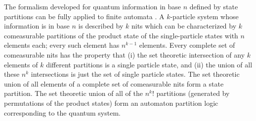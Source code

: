 \documentclass{llncs}
\begin{document}
The formalism developed for quantum information in base $n$ defined by state partitions
can be fully applied to finite automata \cite{svozil-2002-statepart-prl}.
A $k$-particle system whose information is in base $n$
is described by $k$ nits which can be characterized by $k$
comeasurable partitions of the product state of the single-particle
states with $n$ elements each; every such element has $n^{k-1}$ elements.
Every complete set of comeasurable nits has the property that
(i) the set theoretic intersection of any $k$ elements of $k$ different
partitions is a single particle state, and (ii) the union of all these $n^k$
intersections is just the set of single particle states.
The set theoretic union of all elements of a complete set of comeasurable nits
form a state partition.
The set theoretic union of all of the $n^k!$ partitions
(generated by permutations of the product states)
form an automaton partition logic
corresponding to the quantum system.
\end{document}

